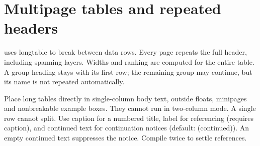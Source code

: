 \section{Multipage tables and repeated headers}
 uses longtable to break between data rows. Every page repeats
the full header, including spanning layers. Widths and ranking are computed for
the entire table. A group heading stays with its first row; the remaining group
may continue, but its name is not repeated automatically.

Place long tables directly in single-column body text, outside floats, minipages
and nonbreakable example boxes. They cannot run in two-column mode. A single row
cannot split. Use caption for a numbered title, label for referencing (requires
caption), and continued text for continuation notices (default: (continued)).
An empty continued text suppresses the notice. Compile twice to settle references.


